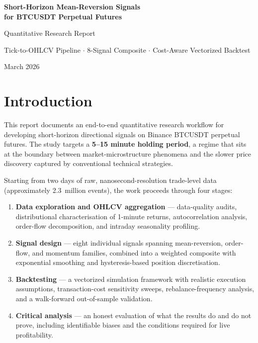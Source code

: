 \documentclass[11pt, a4paper]{article}
\begin{document}
\begin{titlepage}
  \centering
  \vspace*{2cm}
  {\LARGE\bfseries Short-Horizon Mean-Reversion Signals\\[0.4em]
   for BTCUSDT Perpetual Futures\par}
  \vspace{1cm}
  {\large Quantitative Research Report\par}
  \vspace{0.4cm}
  {\normalsize Tick-to-OHLCV Pipeline $\cdot$ 8-Signal Composite
               $\cdot$ Cost-Aware Vectorized Backtest\par}
  \vspace{1.5cm}
  \tableofcontents
  \vfill
  {\normalsize March 2026\par}
\end{titlepage}

\section{Introduction}

This report documents an end-to-end quantitative research workflow for developing
short-horizon directional signals on Binance BTCUSDT perpetual futures.
The study targets a \textbf{5--15 minute holding period}, a regime that sits at the
boundary between market-microstructure phenomena and the slower price discovery
captured by conventional technical strategies.

Starting from two days of raw, nanosecond-resolution trade-level data (approximately
2.3~million events), the work proceeds through four stages:

\begin{enumerate}[leftmargin=2em]
  \item \textbf{Data exploration and OHLCV aggregation} --- data-quality audits,
        distributional characterisation of 1-minute returns, autocorrelation
        analysis, order-flow decomposition, and intraday seasonality profiling.
  \item \textbf{Signal design} --- eight individual signals spanning mean-reversion,
        order-flow, and momentum families, combined into a weighted composite
        with exponential smoothing and hysteresis-based position discretisation.
  \item \textbf{Backtesting} --- a vectorized simulation framework with realistic
        execution assumptions, transaction-cost sensitivity sweeps, rebalance-frequency
        analysis, and a walk-forward out-of-sample validation.
  \item \textbf{Critical analysis} --- an honest evaluation of what the results
        do and do not prove, including identifiable biases and the conditions
        required for live profitability.
\end{enumerate}
\end{document}
